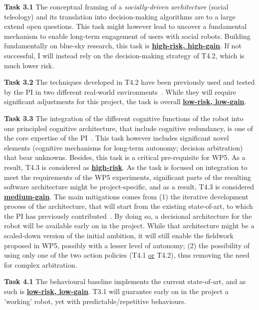 \documentclass[11pt,a4paper]{report}
\begin{document}
\vspace{1em}

\textbf{Task 3.1} The conceptual framing of a \emph{socially-driven
architecture} (social teleology) and its translation into decision-making
algorithms are to a large extend open questions. This task might however lead to
uncover a fundamental mechanism to enable long-term engagement of users
with social robots. Building fundamentally on blue-sky research, this task is
\ul{\bf high-risk, high-gain}. If not successful, I will instead rely on the
decision-making strategy of T4.2, which is much lower risk.

\textbf{Task 3.2} The techniques developed in T4.2 have been previously used and
tested by the PI in two different real-world
environments~\cite{senft2019teaching,winkle2020couch}. While they will require
significant adjustments for this project, the task is overall \ul{\bf low-risk,
low-gain}.

\textbf{Task 3.3} The integration of the different cognitive functions of the
robot into one principled cognitive architecture, that include cognitive
redundancy, is one of the core expertise of the
PI~\cite{lemaignan2017artificial}. This task however includes significant novel
elements (cognitive mechanisms for long-term autonomy; decision arbitration)
that bear unknowns. Besides, this task is a critical pre-requisite for WP5. As a
result, T4.3 is considered as \ul{\bf high-risk}. As the task is focused on
integration to meet the requirements of the WP5 experiments, significant parts
of the resulting software architecture might be project-specific, and as a
result, T4.3 is considered \ul{\bf medium-gain}. The main mitigations comes from
(1) the
iterative development process of the architecture, that will start from the existing
state-of-art, to which the PI has previously
contributed~\cite{lemaignan2017artificial}. By doing so, a decisional
architecture for the robot will be available early on in the project. While that
architecture might be a scaled-down version of the initial ambition, it will
still enable the fieldwork proposed in WP5, possibly with a lesser level of
autonomy; (2) the possibility of using only one of the two action policies (T4.1
\ul{or} T4.2), thus removing the need for complex arbitration.

\vspace{1em}

\textbf{Task 4.1} The behavioural baseline implements the current state-of-art,
and as such is \ul{\bf low-risk, low-gain}. T3.1 will guarantee early on in the
project a 'working' robot, yet with predictable/repetitive behaviours.
\end{document}
